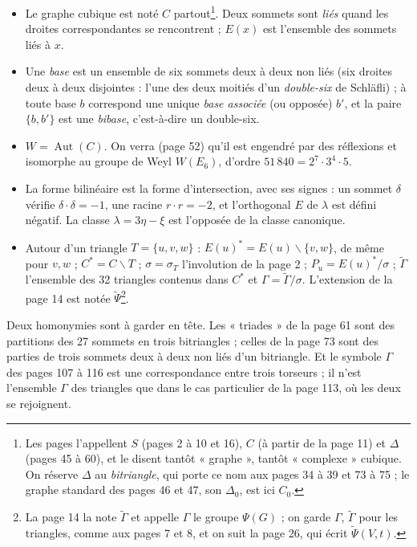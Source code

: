 \documentclass[11pt,a4paper]{article}
\begin{document}
\begin{itemize}
\item Le graphe cubique est noté $C$ partout\footnote{Les pages l'appellent
  $S$ (pages 2 à 10 et 16), $C$ (à partir de la page 11) et $\Delta$ (pages 45
  à 60), et le disent tantôt « graphe », tantôt « complexe » cubique. On réserve
  $\Delta$ au \emph{bitriangle}, qui porte ce nom aux pages 34 à 39 et 73 à 75
  ; le graphe standard des pages 46 et 47, son $\Delta_0$, est ici $C_0$.}.
  Deux sommets sont \emph{liés} quand les droites correspondantes se
  rencontrent ; $E(x)$ est l'ensemble des sommets liés à $x$.
\item Une \emph{base} est un ensemble de six sommets deux à deux non liés
  (six droites deux à deux disjointes : l'une des deux moitiés d'un
  \emph{double-six} de Schläfli) ; à toute base $b$ correspond une unique
  \emph{base associée} (ou opposée) $b'$, et la paire $\lbrace b, b'\rbrace$ est
  une \emph{bibase}, c'est-à-dire un double-six.
\item $W = \operatorname{Aut}(C)$. On verra (page 52) qu'il est engendré par
  des réflexions et isomorphe au groupe de Weyl $W(E_6)$, d'ordre
  $51\,840 = 2^7 \cdot 3^4 \cdot 5$.
\item La forme bilinéaire est la forme d'intersection, avec ses signes : un
  sommet $\delta$ vérifie $\delta \cdot \delta = -1$, une racine $r \cdot r =
  -2$, et l'orthogonal $E$ de $\lambda$ est défini négatif. La classe
  $\lambda = 3\eta - \xi$ est l'opposée de la classe canonique.
\item Autour d'un triangle $T = \lbrace u, v, w\rbrace$ : $E(u)^* = E(u)
  \smallsetminus \lbrace v, w\rbrace$, de même pour $v, w$ ; $C^* = C
  \smallsetminus T$ ; $\sigma = \sigma_T$ l'involution de la page 2 ; $P_u =
  E(u)^*/\sigma$ ; $\widetilde\Gamma$ l'ensemble des 32 triangles contenus dans
  $C^*$ et $\Gamma = \widetilde\Gamma/\sigma$. L'extension de la page 14 est
  notée $\widetilde\Psi$\footnote{La page 14 la note $\widetilde\Gamma$ et
  appelle $\Gamma$ le groupe $\Psi(G)$ ; on garde $\Gamma$, $\widetilde\Gamma$
  pour les triangles, comme aux pages 7 et 8, et on suit la page 26, qui écrit
  $\widetilde\Psi(V, t)$.}.
\end{itemize}

Deux homonymies sont à garder en tête. Les « triades » de la page 61 sont des
partitions des 27 sommets en trois bitriangles ; celles de la page 73 sont des
parties de trois sommets deux à deux non liés d'un bitriangle. Et le symbole
$\Gamma$ des pages 107 à 116 est une correspondance entre trois torseurs ; il
n'est l'ensemble $\Gamma$ des triangles que dans le cas particulier de la
page 113, où les deux se rejoignent.
\end{document}
